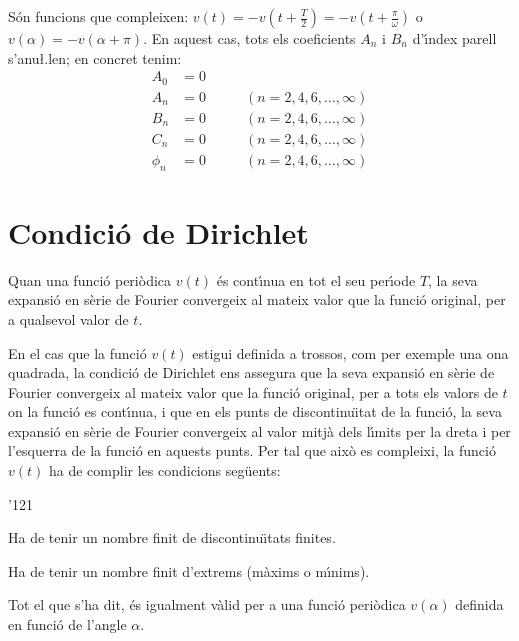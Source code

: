 S\'{o}n funcions que compleixen: $v(t) = -v(t+\frac{T}{2})=
-v(t+\frac{\pi}{\omega})$ o $v(\alpha) = -v(\alpha+\pi)$. En aquest
cas, tots els coeficients $A_n$ i $B_n$ d'\'{\i}ndex parell s'anu{\l.l}en;
en concret tenim:
\begin{subequations}
\begin{alignat}{2}
    A_0 &= 0       & \\[0.5ex]
    A_n &= 0       &\qquad (n = 2,4,6,\ldots,\infty)\\[0.5ex]
    B_n &= 0       &\qquad (n = 2,4,6,\ldots,\infty)\\[0.5ex]
    C_n &= 0       &\qquad (n = 2,4,6,\ldots,\infty)\\[0.5ex]
    \phi_n &= 0 &\qquad (n = 2,4,6,\ldots,\infty)
\end{alignat}
\end{subequations}

\section{Condici\'{o} de Dirichlet}

Quan una funci\'{o} peri\`{o}dica $v(t)$  \'{e}s cont\'{\i}nua en tot el seu per\'{\i}ode
$T$, la seva expansi\'{o} en s\`{e}rie de Fourier convergeix al mateix valor
que la funci\'{o} original, per a qualsevol valor de $t$.

En el cas que la funci\'{o} $v(t)$ estigui definida a trossos, com per
exemple una ona quadrada, la condici\'{o} de Dirichlet ens assegura que
la seva expansi\'{o} en s\`{e}rie de Fourier convergeix al mateix valor que
la funci\'{o} original, per a tots els valors de $t$ on la funci\'{o} es
cont\'{\i}nua, i que en els punts de discontinu\"{\i}tat de la funci\'{o}, la seva
expansi\'{o} en s\`{e}rie de Fourier convergeix al valor mitj\`{a} dels l\'{\i}mits
per la dreta i per l'esquerra de la funci\'{o} en aquests punts. Per tal
que aix\`{o} es compleixi, la funci\'{o} $v(t)$ ha de complir les condicions
seg\"{u}ents:
\begin{dinglist}{'121}
   \item Ha de tenir un nombre finit de discontinu\"{\i}tats
   finites.
   \item Ha de tenir un nombre finit d'extrems (m\`{a}xims o m\'{\i}nims).
\end{dinglist}

Tot el que s'ha dit, \'{e}s igualment v\`{a}lid per a una funci\'{o} peri\`{o}dica
$v(\alpha)$  definida en funci\'{o} de l'angle $\alpha$.

